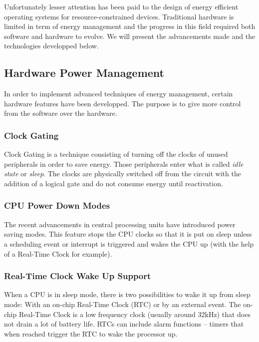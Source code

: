 Unfortunately lesser attention has been paid to the design of energy efficient operating systems for resource-constrained devices.
Traditional hardware is limited in term of energy management and the progress in this field required both software and hardware to evolve.
We will present the advancements made and the technologies developped below.


\subsection{Hardware Power Management}
In order to implement advanced techniques of energy management, certain hardware features have been developped.
The purpose is to give more control from the software over the hardware.

\subsubsection{Clock Gating}
Clock Gating is a technique consisting of turning off the clocks of unused peripherals in order to save energy.
Those peripherals enter what is called \textit{idle state} or \textit{sleep}.
The clocks are physically switched off from the circuit with the addition of a logical gate and do not consume energy until reactivation.

\subsubsection{CPU Power Down Modes}
The recent advancements in central processing units have introduced power saving modes.
This feature stops the CPU clocks so that it is put on sleep unless
    a scheduling event or interrupt is triggered and wakes the CPU up (with the help of a Real-Time Clock for example).

\subsubsection{Real-Time Clock Wake Up Support}
When a CPU is in sleep mode, there is two possibilities to wake it up from sleep mode: %
With an on-chip Real-Time Clock (RTC) or by an external event.
The on-chip Real-Time Clock is a low frequency clock (usually around 32kHz) that does not drain a lot of battery life.
RTCs can include alarm functions – timers that when reached trigger the RTC to wake the processor up.

